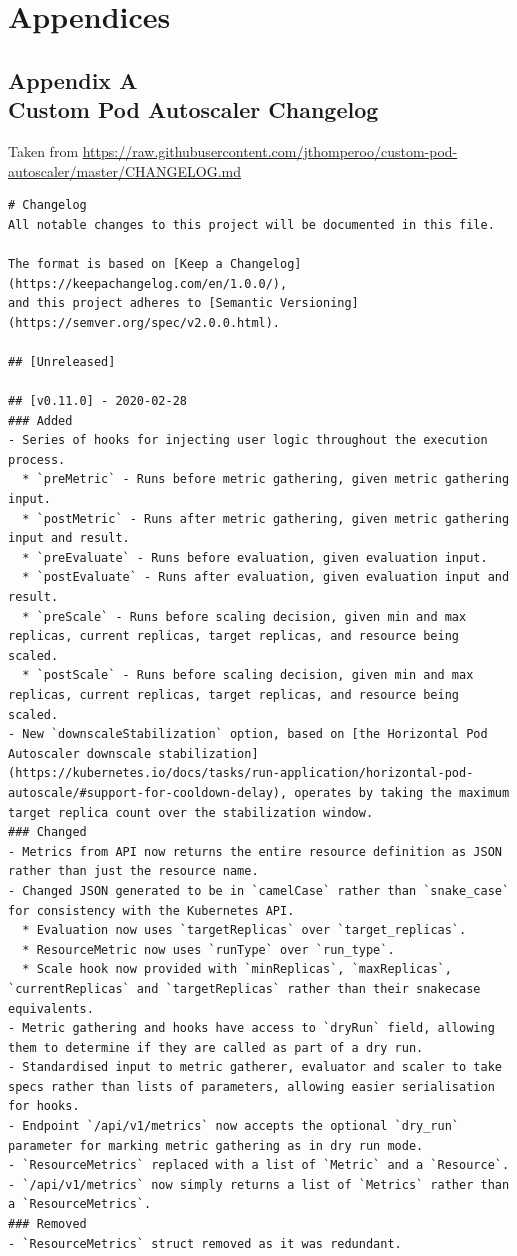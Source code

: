 \newpage

\section*{Appendices}

\subsection*{%
    Appendix A \\
    \small Custom Pod Autoscaler Changelog}

Taken from
\url{https://raw.githubusercontent.com/jthomperoo/custom-pod-autoscaler/master/CHANGELOG.md}

\begin{lstlisting}
# Changelog
All notable changes to this project will be documented in this file.

The format is based on [Keep a Changelog](https://keepachangelog.com/en/1.0.0/),
and this project adheres to [Semantic Versioning](https://semver.org/spec/v2.0.0.html).

## [Unreleased]

## [v0.11.0] - 2020-02-28
### Added
- Series of hooks for injecting user logic throughout the execution process.
  * `preMetric` - Runs before metric gathering, given metric gathering input.
  * `postMetric` - Runs after metric gathering, given metric gathering input and result.
  * `preEvaluate` - Runs before evaluation, given evaluation input.
  * `postEvaluate` - Runs after evaluation, given evaluation input and result.
  * `preScale` - Runs before scaling decision, given min and max replicas, current replicas, target replicas, and resource being scaled.
  * `postScale` - Runs before scaling decision, given min and max replicas, current replicas, target replicas, and resource being scaled.
- New `downscaleStabilization` option, based on [the Horizontal Pod Autoscaler downscale stabilization](https://kubernetes.io/docs/tasks/run-application/horizontal-pod-autoscale/#support-for-cooldown-delay), operates by taking the maximum target replica count over the stabilization window.
### Changed
- Metrics from API now returns the entire resource definition as JSON rather than just the resource name.
- Changed JSON generated to be in `camelCase` rather than `snake_case` for consistency with the Kubernetes API.
  * Evaluation now uses `targetReplicas` over `target_replicas`.
  * ResourceMetric now uses `runType` over `run_type`.
  * Scale hook now provided with `minReplicas`, `maxReplicas`, `currentReplicas` and `targetReplicas` rather than their snakecase equivalents.
- Metric gathering and hooks have access to `dryRun` field, allowing them to determine if they are called as part of a dry run.
- Standardised input to metric gatherer, evaluator and scaler to take specs rather than lists of parameters, allowing easier serialisation for hooks.
- Endpoint `/api/v1/metrics` now accepts the optional `dry_run` parameter for marking metric gathering as in dry run mode.
- `ResourceMetrics` replaced with a list of `Metric` and a `Resource`.
- `/api/v1/metrics` now simply returns a list of `Metrics` rather than a `ResourceMetrics`.
### Removed
- `ResourceMetrics` struct removed as it was redundant.


\end{lstlisting}
